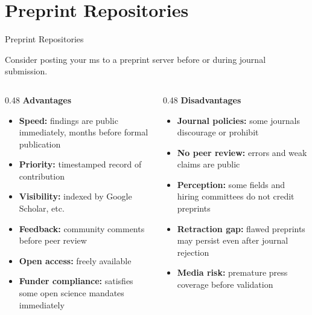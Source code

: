 \documentclass{beamer}
\begin{document}

\section{Preprint Repositories}


\begin{frame}{Preprint Repositories}

  \footnotesize

  Consider posting your ms to a preprint server before or during journal submission.

   \smallskip


  \begin{columns}[T]

    \begin{column}{0.48\textwidth}
      \textbf{Advantages}
      \smallskip
      \begin{itemize}
        \item \textbf{Speed:} findings are public immediately,
          months before formal publication
        \item \textbf{Priority:} timestamped record of contribution
        \item \textbf{Visibility:} indexed by Google Scholar, etc.
        \item \textbf{Feedback:} community comments before peer review
        \item \textbf{Open access:} freely available
        \item \textbf{Funder compliance:} satisfies some open
          science mandates immediately
      \end{itemize}
    \end{column}

    \begin{column}{0.48\textwidth}
      \textbf{Disadvantages}
      \smallskip
      \begin{itemize}
        \item \textbf{Journal policies:} some journals
          discourage or prohibit
        \item \textbf{No peer review:} errors and weak claims
          are public
        \item \textbf{Perception:} some fields and hiring
          committees do not credit preprints
        \item \textbf{Retraction gap:} flawed preprints may
          persist even after journal rejection
        \item \textbf{Media risk:} premature press coverage
          before validation
      \end{itemize}
    \end{column}

  \end{columns}

\end{frame}
\end{document}
